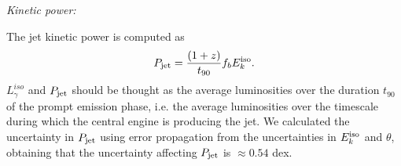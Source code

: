 \documentclass[12pt]{article}
\begin{document}
\emph{Kinetic power:}

The jet kinetic power is computed as
\begin{equation}
P_{\rm jet} = \frac{(1+z)}{t_{90}} f_b E_k^{\rm iso}.
\end{equation}
$L_\gamma^{iso}$ and $P_{\rm jet}$ should be thought as the average luminosities over the duration $t_{90}$ of the prompt emission phase, i.e. the average luminosities over the timescale during which the central engine is producing the jet.
We calculated the uncertainty in $P_{\rm jet}$ using error propagation from the uncertainties in $E_k^{\rm iso}$ and $\theta$, obtaining that the uncertainty affecting $P_{\rm jet}$ is $\approx 0.54$ dex.





\begin{comment}
\subsection*{Calculation of the beaming factor}

In this section we clarify the calculation of the beaming factor for the blazars and GRBs. 

For any relativistic jet there are essentially two characteristic angles: the actual jet collimation angle $\theta_{\rm jet}$ and the angle of the cone formed by the radiation due to relativistic aberration $\theta_{\rm rad} \approx 1/\Gamma$ \cite{sgranot10}. 
%
The beaming angle of the jet -- the angle which we should use when calculating the beaming factor -- will correspond to $\theta \sim \max (\theta_{\rm jet}, \theta_{\rm rad})$. GRBs have typically ultra-relativistic jets such that $\theta_{\rm rad} \ll \theta_{\rm jet}$ \cite{sracusin11,sghirlanda12} therefore $\theta \sim \theta_{\rm jet}$ as estimated from the jet breaks \cite{sfrail01,spana06}. On the other hand, we have the opposite situation for the jets in blazars, $\theta_{\rm rad} \gg \theta_{\rm jet}$ such that $\theta \sim \theta_{\rm rad}$   \cite{sjorstad05,spush09,sghise10}. 

Figure \ref{fig:jets} shows a cartoon which illustrates schematically the relative sizes of the jet and radiation cone for blazar and GRB jets.

\begin{figure}[!t]
\centering
\texttt{[image: sfig1.pdf]}
\caption{Cartoon illustrating the relation between the sizes of the jet and the radiation cone due to relativistic aberration in blazars and GRBs. For blazars, the larger cone (blue) corresponds to the radiation and the smaller one to the jet (red); for GRBs, we have the opposite situation.}
\label{fig:jets}
\end{figure}

The values of the beaming angles for the GRBs are listed in Table S1. The beaming angles for the blazars were calculated from the bulk Lorentz factors derived for a subsample of 41 blazars by \citen{spush09} as described in the main text.
\end{comment}
\end{document}
